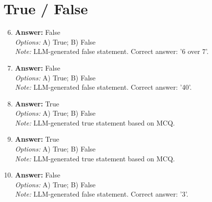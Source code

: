 \documentclass[12pt]{article}
\begin{document}
\section*{True / False}
\begin{enumerate}[label=\arabic*.]
\setcounter{enumi}{5}
\item \textbf{Answer:} False
\\ \textit{Options:} A) True; B) False
\\ \textit{Note:} LLM-generated false statement. Correct answer: '6 over 7'.
\item \textbf{Answer:} False
\\ \textit{Options:} A) True; B) False
\\ \textit{Note:} LLM-generated false statement. Correct answer: '40'.
\item \textbf{Answer:} True
\\ \textit{Options:} A) True; B) False
\\ \textit{Note:} LLM-generated true statement based on MCQ.
\item \textbf{Answer:} True
\\ \textit{Options:} A) True; B) False
\\ \textit{Note:} LLM-generated true statement based on MCQ.
\item \textbf{Answer:} False
\\ \textit{Options:} A) True; B) False
\\ \textit{Note:} LLM-generated false statement. Correct answer: '3'.
\end{enumerate}
\end{document}
